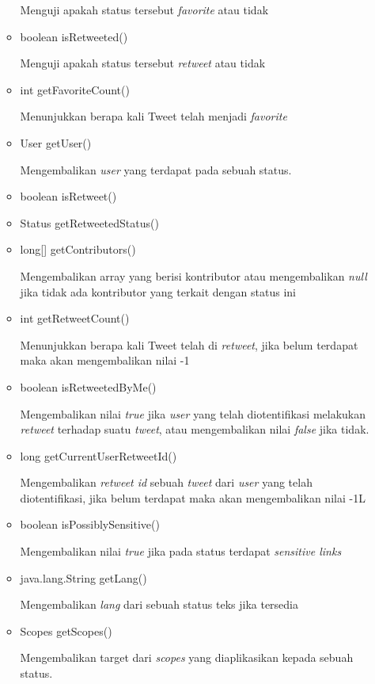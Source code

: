 \begin{itemize}
\begin{itemize}
			Menguji apakah status tersebut \textit{favorite} atau tidak
			\item boolean isRetweeted()
			
			Menguji apakah status tersebut \textit{retweet} atau tidak
			\item int getFavoriteCount()
			
			Menunjukkan berapa kali Tweet telah menjadi \textit{favorite}
			\item User getUser()
			
			Mengembalikan \textit{user} yang terdapat pada sebuah status.
			\item boolean isRetweet()
			\item Status getRetweetedStatus()
			\item long[] getContributors()
			
			Mengembalikan array yang berisi kontributor atau mengembalikan \textit{null} jika tidak ada kontributor yang terkait dengan status ini
			\item int getRetweetCount()
			
			Menunjukkan berapa kali Tweet telah di \textit{retweet}, jika belum terdapat maka akan mengembalikan nilai -1
			\item boolean isRetweetedByMe()
			
			Mengembalikan nilai \textit{true} jika \textit{user} yang telah diotentifikasi melakukan \textit{retweet} terhadap suatu \textit{tweet}, atau mengembalikan nilai \textit{false} jika tidak.
			\item long getCurrentUserRetweetId()
			
			Mengembalikan \textit{retweet id} sebuah \textit{tweet} dari \textit{user} yang telah diotentifikasi, jika belum terdapat maka akan mengembalikan nilai -1L
			\item boolean isPossiblySensitive()
			
			Mengembalikan nilai \textit{true} jika pada status terdapat \textit{sensitive links}
			\item java.lang.String getLang()
			
			Mengembalikan \textit{lang} dari sebuah status teks jika tersedia
			\item Scopes getScopes()
			
			Mengembalikan target dari \textit{scopes} yang diaplikasikan kepada sebuah status.
		\end{itemize}
	\end{itemize}
	
